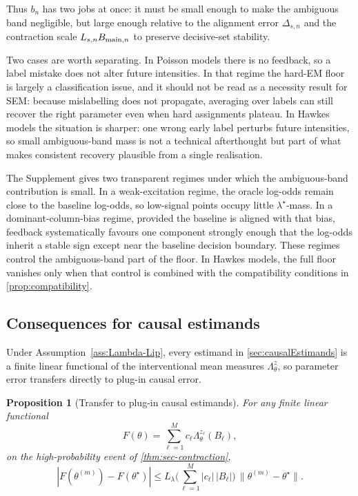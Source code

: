 \documentclass{statsoc}
\newtheorem{proposition}[proposition]{Proposition}
\newcommand{\1}{\mathbbm{1}}
\begin{document}
Thus \(b_n\) has two jobs at once: it must be small enough to make the ambiguous band negligible, but large enough relative to the alignment error \(\Delta_{s,n}\) and the contraction scale \(L_{s,n}B_{{\rm main},n}\) to preserve decisive-set stability.

Two cases are worth separating. In Poisson models there is no feedback, so a label mistake does not alter future intensities. In that regime the hard-EM floor is largely a classification issue, and it should not be read as a necessity result for SEM: because mislabelling does not propagate, averaging over labels can still recover the right parameter even when hard assignments plateau. In Hawkes models the situation is sharper: one wrong early label perturbs future intensities, so small ambiguous-band mass is not a technical afterthought but part of what makes consistent recovery plausible from a single realisation. 

The Supplement gives two transparent regimes under which the ambiguous-band contribution is small. In a weak-excitation regime, the oracle log-odds remain close to the baseline log-odds, so low-signal points occupy little \(\lambda^\star\)-mass. In a dominant-column-bias regime, provided the baseline is aligned with that bias, feedback systematically favours one component strongly enough that the log-odds inherit a stable sign except near the baseline decision boundary. These regimes control the ambiguous-band part of the floor. In Hawkes models, the full floor vanishes only when that control is combined with the compatibility conditions in \cref{prop:compatibility}.

\subsection{Consequences for causal estimands}\label{subsec:estimands}


Under Assumption~\ref{ass:Lambda-Lip}, every estimand in \cref{sec:causalEstimands} is a finite linear functional of the interventional mean measures \(\Lambda_\theta^z\), so parameter error transfers directly to plug-in causal error.

\begin{proposition}[Transfer to plug-in causal estimands]\label{thm:sec-estimands}
For any finite linear functional
\[
F(\theta)=\sum_{\ell=1}^M c_\ell \Lambda_\theta^{z_\ell}(B_\ell),
\]
on the high-probability event of \cref{thm:sec-contraction},
\[
|F(\theta^{(m)})-F(\theta^\star)|
\le
L_\lambda\Big(\sum_{\ell=1}^M |c_\ell|\,|B_\ell|\Big)\,\|\theta^{(m)}-\theta^\star\|.
\]
\end{proposition}
\end{document}
